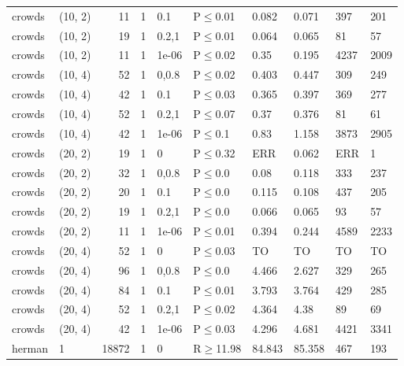 \begin{longtable}{llrrllllll}
 crowds        & (10, 2)  &     	11 & 1 & 0.1   & P$\leq$0.01  & 0.082   & 0.071    & 397    & 201    \\
 crowds        & (10, 2)  &     	19 & 1 & 0.2,1 & P$\leq$0.01  & 0.064   & 0.065    & 81     & 57     \\
 crowds        & (10, 2)  &     	11 & 1 & 1e-06 & P$\leq$0.02  & 0.35    & 0.195    & 4237   & 2009   \\
 crowds        & (10, 4)  &     	52 & 1 & 0,0.8 & P$\leq$0.02  & 0.403   & 0.447    & 309    & 249    \\
 crowds        & (10, 4)  &     	42 & 1 & 0.1   & P$\leq$0.03  & 0.365   & 0.397    & 369    & 277    \\
 crowds        & (10, 4)  &     	52 & 1 & 0.2,1 & P$\leq$0.07  & 0.37    & 0.376    & 81     & 61     \\
 crowds        & (10, 4)  &     	42 & 1 & 1e-06 & P$\leq$0.1   & 0.83    & 1.158    & 3873   & 2905   \\
 crowds        & (20, 2)  &     	19 & 1 & 0     & P$\leq$0.32  & ERR     & 0.062    & ERR    & 1      \\
 crowds        & (20, 2)  &     	32 & 1 & 0,0.8 & P$\leq$0.0   & 0.08    & 0.118    & 333    & 237    \\
 crowds        & (20, 2)  &     	20 & 1 & 0.1   & P$\leq$0.0   & 0.115   & 0.108    & 437    & 205    \\
 crowds        & (20, 2)  &     	19 & 1 & 0.2,1 & P$\leq$0.0   & 0.066   & 0.065    & 93     & 57     \\
 crowds        & (20, 2)  &     	11 & 1 & 1e-06 & P$\leq$0.01  & 0.394   & 0.244    & 4589   & 2233   \\
 crowds        & (20, 4)  &     	52 & 1 & 0     & P$\leq$0.03  & TO      & TO       & TO     & TO     \\
 crowds        & (20, 4)  &     	96 & 1 & 0,0.8 & P$\leq$0.0   & 4.466   & 2.627    & 329    & 265    \\
 crowds        & (20, 4)  &     	84 & 1 & 0.1   & P$\leq$0.01  & 3.793   & 3.764    & 429    & 285    \\
 crowds        & (20, 4)  &     	52 & 1 & 0.2,1 & P$\leq$0.02  & 4.364   & 4.38     & 89     & 69     \\
 crowds        & (20, 4)  &     	42 & 1 & 1e-06 & P$\leq$0.03  & 4.296   & 4.681    & 4421   & 3341   \\
 herman        & 1        &  	18872 & 1 & 0     & R$\geq$11.98 & 84.843  & 85.358   & 467    & 193    \\

\end{longtable}
